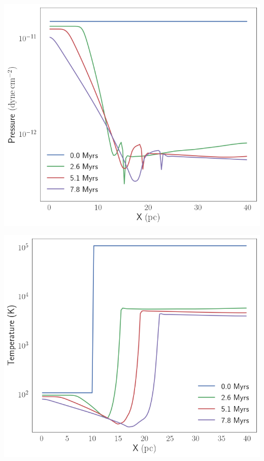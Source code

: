 	\begin{marginfigure}
		\centering
		\includegraphics[width=1\linewidth]{DataImages/H2CoolingPRSprofile}
		\caption{}
		\label{fig:h2coolingprsprofile}
	\end{marginfigure}
	
	\begin{marginfigure}
		\centering
		\includegraphics[width=1\linewidth]{DataImages/H2CoolingTMPprofile}
		\caption{}
		\label{fig:h2coolingtmpprofile}
	\end{marginfigure}
	
